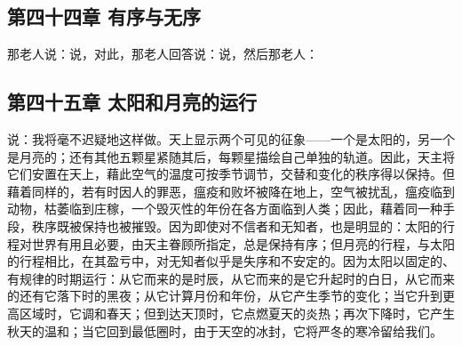 
\subsection{第四十四章 有序与无序}

那老人说：说，对此，那老人回答说：说，然后那老人：\par


\subsection{第四十五章 太阳和月亮的运行}

说：我将毫不迟疑地这样做。天上显示两个可见的征象——一个是太阳的，另一个是月亮的；还有其他五颗星紧随其后，每颗星描绘自己单独的轨道。因此，天主将它们安置在天上，藉此空气的温度可按季节调节，交替和变化的秩序得以保持。但藉着同样的，若有时因人的罪恶，瘟疫和败坏被降在地上，空气被扰乱，瘟疫临到动物，枯萎临到庄稼，一个毁灭性的年份在各方面临到人类；因此，藉着同一种手段，秩序既被保持也被摧毁。因为即使对不信者和无知者，也是明显的：太阳的行程对世界有用且必要，由天主眷顾所指定，总是保持有序；但月亮的行程，与太阳的行程相比，在其盈亏中，对无知者似乎是失序和不安定的。因为太阳以固定的、有规律的时期运行：从它而来的是时辰，从它而来的是它升起时的白日，从它而来的还有它落下时的黑夜；从它计算月份和年份，从它产生季节的变化；当它升到更高区域时，它调和春天；但到达天顶时，它点燃夏天的炎热；再次下降时，它产生秋天的温和；当它回到最低圈时，由于天空的冰封，它将严冬的寒冷留给我们。\par

